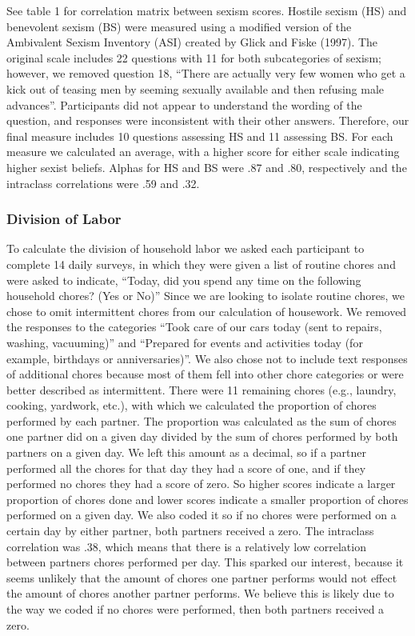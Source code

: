 \documentclass[
  man]{apa6}
\begin{document}
See table 1 for correlation matrix between sexism scores. Hostile sexism (HS) and benevolent sexism (BS) were measured using a modified version of the Ambivalent Sexism Inventory (ASI) created by Glick and Fiske (1997). The original scale includes 22 questions with 11 for both subcategories of sexism; however, we removed question 18, ``There are actually very few women who get a kick out of teasing men by seeming sexually available and then refusing male advances''. Participants did not appear to understand the wording of the question, and responses were inconsistent with their other answers. Therefore, our final measure includes 10 questions assessing HS and 11 assessing BS. For each measure we calculated an average, with a higher score for either scale indicating higher sexist beliefs. Alphas for HS and BS were .87 and .80, respectively and the intraclass correlations were .59 and .32.

\hypertarget{division-of-labor}{%
\subsubsection{Division of Labor}\label{division-of-labor}}

To calculate the division of household labor we asked each participant to complete 14 daily surveys, in which they were given a list of routine chores and were asked to indicate, ``Today, did you spend any time on the following household chores? (Yes or No)'' Since we are looking to isolate routine chores, we chose to omit intermittent chores from our calculation of housework. We removed the responses to the categories ``Took care of our cars today (sent to repairs, washing, vacuuming)'' and ``Prepared for events and activities today (for example, birthdays or anniversaries)''. We also chose not to include text responses of additional chores because most of them fell into other chore categories or were better described as intermittent. There were 11 remaining chores (e.g., laundry, cooking, yardwork, etc.), with which we calculated the proportion of chores performed by each partner. The proportion was calculated as the sum of chores one partner did on a given day divided by the sum of chores performed by both partners on a given day. We left this amount as a decimal, so if a partner performed all the chores for that day they had a score of one, and if they performed no chores they had a score of zero. So higher scores indicate a larger proportion of chores done and lower scores indicate a smaller proportion of chores performed on a given day. We also coded it so if no chores were performed on a certain day by either partner, both partners received a zero. The intraclass correlation was .38, which means that there is a relatively low correlation between partners chores performed per day. This sparked our interest, because it seems unlikely that the amount of chores one partner performs would not effect the amount of chores another partner performs. We believe this is likely due to the way we coded if no chores were performed, then both partners received a zero.
\end{document}
